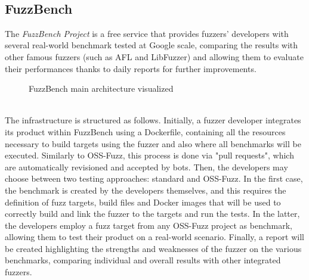 \ \\
\subsection{FuzzBench}
The \textit{FuzzBench Project} \cite{fuzzbench_paper} is a free service that provides fuzzers' developers with several real-world benchmark tested at Google scale, comparing the results with other famous fuzzers (such as AFL and LibFuzzer) and allowing them to evaluate their performances thanks to daily reports for further improvements.
\cite{fuzzbench_docs}
\newline
\begin{figure}[h]
\caption{FuzzBench main architecture visualized \cite{fuzzbench_docs}}
\label{fig:fuzzbench_architecture}
\end{figure}
\ \\
The infrastructure is structured as follows.
\newline \newline
Initially, a fuzzer developer integrates its product within FuzzBench using a Dockerfile, containing all the resources necessary to build targets using the fuzzer and also where all benchmarks will be executed.
\newline
Similarly to OSS-Fuzz, this process is done via "pull requests", which are automatically revisioned and accepted by bots.
\newline \newline
Then, the developers may choose between two testing approaches: standard and OSS-Fuzz.
\newline
In the first case, the benchmark is created by the developers themselves, and this requires the definition of fuzz targets, build files and Docker images that will be used to correctly build and link the fuzzer to the targets and run the tests.
\newline
In the latter, the developers employ a fuzz target from any OSS-Fuzz project as benchmark, allowing them to test their product on a real-world scenario.
\newline \newline
Finally, a report will be created highlighting the strengths and weaknesses of the fuzzer on the various benchmarks, comparing individual and overall results with other integrated fuzzers.